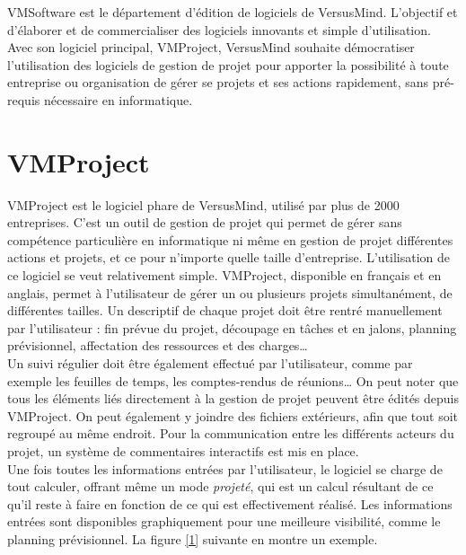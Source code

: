 \documentclass[12pt]{report}
\begin{document}
VMSoftware est le département d’édition de logiciels de VersusMind. L’objectif et d’élaborer et de commercialiser des logiciels innovants et simple d’utilisation. Avec son logiciel principal, VMProject, VersusMind souhaite démocratiser l’utilisation des logiciels de gestion de projet pour apporter la possibilité à toute entreprise ou organisation de gérer se projets et ses actions rapidement, sans pré-requis nécessaire en informatique.\\


  \section{VMProject}
  
VMProject est le logiciel phare de VersusMind, utilisé par plus de 2000 entreprises. C’est un outil de gestion de projet qui permet de gérer sans compétence particulière en informatique ni même en gestion de projet différentes actions et projets, et ce pour n’importe quelle taille d’entreprise. L’utilisation de ce logiciel se veut relativement simple. VMProject, disponible en français et en anglais, permet à l’utilisateur de gérer un ou plusieurs projets simultanément, de différentes tailles. Un descriptif de chaque projet doit être rentré manuellement par l’utilisateur : fin prévue du projet, découpage en tâches et en jalons, planning prévisionnel, affectation des ressources et des charges… \\

Un suivi régulier doit être également effectué par l’utilisateur, comme par exemple les feuilles de temps, les comptes-rendus de réunions… On peut noter que tous les éléments liés directement à la gestion de projet peuvent être édités depuis VMProject. On peut également y joindre des fichiers extérieurs, afin que tout soit regroupé au même endroit. Pour la communication entre les différents acteurs du projet, un système de commentaires interactifs est mis en place.\\

Une fois toutes les informations entrées par l’utilisateur, le logiciel se charge de tout calculer, offrant même un mode \emph{projeté}, qui est un calcul résultant de ce qu’il reste à faire en fonction de ce qui est effectivement réalisé. Les informations entrées sont disponibles graphiquement pour une meilleure visibilité, comme le planning prévisionnel. La figure \ref{1} suivante en montre un exemple.\\ 
\end{document}
